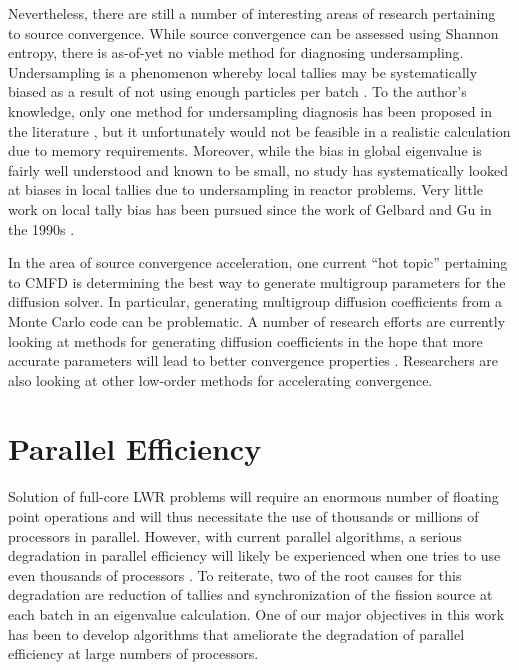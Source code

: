 Nevertheless, there are still a number of interesting areas of research
pertaining to source convergence. While source convergence can be assessed using
Shannon entropy, there is as-of-yet no viable method for diagnosing
undersampling. Undersampling is a phenomenon whereby local tallies may be
systematically biased as a result of not using enough particles per batch
\cite{nse-ueki-2005, nse-ueki-2008}. To the author's knowledge, only one method
for undersampling diagnosis has been proposed in the literature
\cite{jnst-ueki-2011}, but it unfortunately would not be feasible in a realistic
calculation due to memory requirements. Moreover, while the bias in global
eigenvalue is fairly well understood \cite{ane-brissenden-1986} and known to be
small, no study has systematically looked at biases in local tallies due to
undersampling in reactor problems. Very little work on local tally bias has been
pursued since the work of Gelbard and Gu in the 1990s \cite{trans-gelbard-1993,
  nse-gelbard-1994}.

In the area of source convergence acceleration, one current ``hot topic''
pertaining to CMFD is determining the best way to generate multigroup parameters
for the diffusion solver. In particular, generating multigroup diffusion
coefficients from a Monte Carlo code can be problematic. A number of research
efforts are currently looking at methods for generating diffusion coefficients
in the hope that more accurate parameters will lead to better convergence
properties \cite{ane-fridman-2011, nse-pounders-2009}. Researchers are also
looking at other low-order methods for accelerating convergence.

\section{Parallel Efficiency}

Solution of full-core LWR problems will require an enormous number of floating
point operations and will thus necessitate the use of thousands or millions of
processors in parallel. However, with current parallel algorithms, a serious
degradation in parallel efficiency will likely be experienced when one tries to
use even thousands of processors \cite{physor-hoogenboom-2012}. To reiterate,
two of the root causes for this degradation are reduction of tallies and
synchronization of the fission source at each batch in an eigenvalue
calculation. One of our major objectives in this work has been to develop
algorithms that ameliorate the degradation of parallel efficiency at large
numbers of processors.

